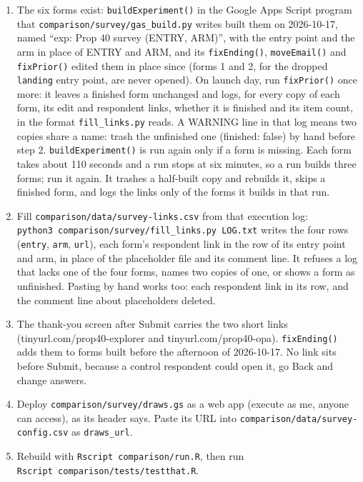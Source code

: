 \begin{enumerate}
\def\labelenumi{\arabic{enumi}.}
\tightlist
\item
  The six forms exist: \texttt{buildExperiment()} in the Google Apps Script program that
  \texttt{comparison/survey/gas\_build.py} writes built them on 2026-10-17, named ``exp: Prop 40 survey
  (ENTRY, ARM)'', with the entry point and the arm in place of ENTRY and ARM, and its \texttt{fixEnding()},
  \texttt{moveEmail()} and \texttt{fixPrior()} edited them in place since (forms 1 and 2, for the dropped
  \texttt{landing} entry point, are never opened). On launch day, run \texttt{fixPrior()} once more: it leaves a
  finished form unchanged and logs, for every copy of each form, its edit and respondent links,
  whether it is finished and its item count, in the format \texttt{fill\_links.py} reads. A WARNING line
  in that log means two copies share a name: trash the unfinished one (finished: false) by hand
  before step 2. \texttt{buildExperiment()} is run again only if a form is missing. Each form takes about
  110 seconds and a run stops at six minutes, so a run builds three forms; run it again. It trashes
  a half-built copy and rebuilds it, skips a finished form, and logs the links only of the forms it
  builds in that run.
\item
  Fill \texttt{comparison/data/survey-links.csv} from that execution log: \texttt{python3\ comparison/survey/fill\_links.py\ LOG.txt} writes the four rows (\texttt{entry}, \texttt{arm}, \texttt{url}), each
  form's respondent link in the row of its entry point and arm, in place of the placeholder file
  and its comment line. It refuses a log that lacks one of the four forms, names two copies of
  one, or shows a form as unfinished. Pasting by hand works too: each respondent link in its row,
  and the comment line about placeholders deleted.
\item
  The thank-you screen after Submit carries the two short links (tinyurl.com/prop40-explorer and
  tinyurl.com/prop40-opa). \texttt{fixEnding()} adds them to forms built before the afternoon of
  2026-10-17. No link sits before Submit, because a control respondent could open it, go Back and
  change answers.
\item
  Deploy \texttt{comparison/survey/draws.gs} as a web app (execute as me, anyone can access), as its
  header says. Paste its URL into \texttt{comparison/data/survey-config.csv} as \texttt{draws\_url}.
\item
  Rebuild with \texttt{Rscript\ comparison/run.R}, then run \texttt{Rscript\ comparison/tests/testthat.R}.

\end{enumerate}
